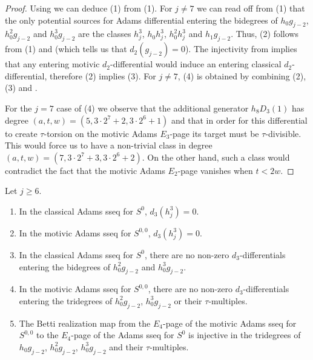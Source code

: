 \begin{proof}
  Using  we can deduce (1) from (1).  
  For $j \neq 7$  we can read off from (1) that the only potential sources for Adams differential entering the bidegrees of $h_0g_{j-2}$, $h_0^2 g_{j-2}$ and $h_0^3 g_{j-2}$ are
  the classes $h_j^3$, $h_0h_j^3$, $h_0^2h_j^3$ and $h_1g_{j-2}$.
  Thus, (2) follows from (1) and  (which tells us that $d_2(g_{j-2}) = 0$).
  The injectivity from  implies that any entering motivic $d_2$-differential would induce an entering classical $d_2$-differential, therefore (2) implies (3).  
  For $j \neq 7$, (4) is obtained by combining (2), (3) and .

  For the $j=7$ case of (4) we observe that the additional generator $h_8D_3(1)$ has degree
  $(a,t,w) = (5, 3 \cdot 2^7 + 2, 3 \cdot 2^6 + 1)$ and that
  in order for this differential to create $\tau$-torsion on the motivic Adams $E_3$-page its target must be $\tau$-divisible.
  This would force us to have a non-trivial class in degree
  $(a,t,w) = (7, 3 \cdot 2^7 + 3, 3 \cdot 2^6 + 2)$.
  On the other hand, such a class would contradict the fact that
  the motivic Adams $E_2$-page vanishes when $t < 2w$.
\end{proof}

\begin{lem} \label{lem:d3 diffls}
  Let $j \geq 6$.
  \begin{enumerate}
  \item In the classical Adams sseq for $S^{0}$, $d_3(h_j^3) = 0$.
  \item In the motivic Adams sseq for $S^{0,0}$, $d_3(h_j^3) = 0$.
  \item In the classical Adams sseq for $S^0$, there are no non-zero $d_3$-differentials entering the bidegrees of $h_0^2 g_{j-2}$ and $h_0^3 g_{j-2}$.
  \item In the motivic Adams sseq for $S^{0,0}$, there are no non-zero $d_3$-differentials entering the tridegrees of $h_0^2 g_{j-2}$, $h_0^3 g_{j-2}$ or their $\tau$-multiples.
  \item The Betti realization map from
    the $E_4$-page of the motivic Adams sseq for $S^{0,0}$ to
    the $E_4$-page of the Adams sseq for $S^{0}$ is
    injective in the tridegrees of $h_0g_{j-2}$, $h_0^2 g_{j-2}$, $h_0^3 g_{j-2}$ and their $\tau$-multiples.
  \end{enumerate}  
\end{lem}

